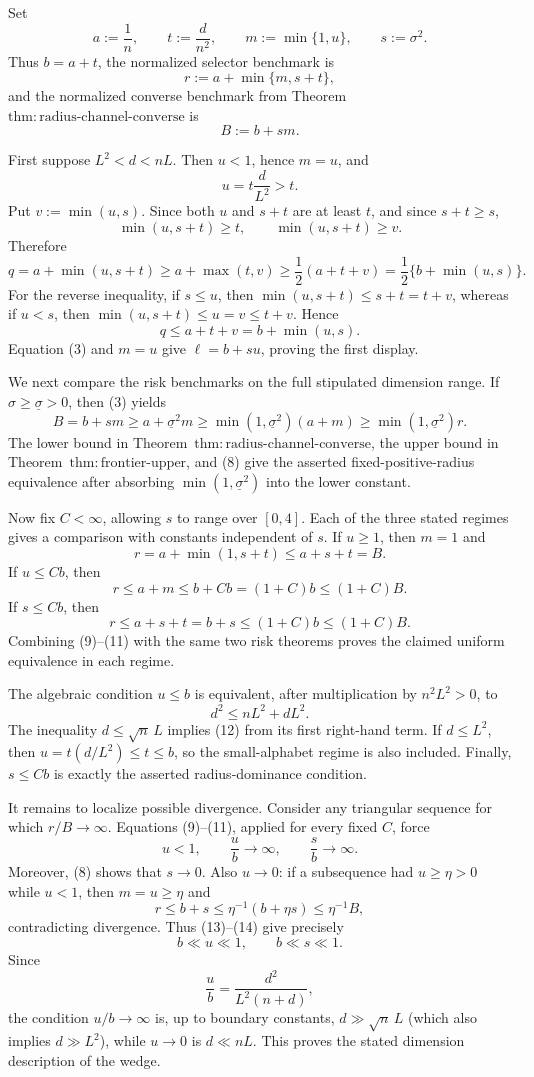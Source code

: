 Set
\[
 a:=\frac1n,\qquad t:=\frac d{n^2},\qquad
 m:=\min\{1,u\},\qquad s:=\sigma^2.
\tag{1}
\]
Thus \(b=a+t\), the normalized selector benchmark is
\[
 r:=a+\min\{m,s+t\},
\tag{2}
\]
and the normalized converse benchmark from Theorem~\(\mathrm{thm:radius\text{-}channel\text{-}converse}\) is
\[
 B:=b+sm.
\tag{3}
\]

First suppose \(L^2<d<nL\).  Then \(u<1\), hence \(m=u\), and
\[
 u=t\frac d{L^2}>t.
\tag{4}
\]
Put \(v:=\min(u,s)\).  Since both \(u\) and \(s+t\) are at least \(t\), and since \(s+t\ge s\),
\[
 \min(u,s+t)\ge t,
 \qquad
 \min(u,s+t)\ge v.
\tag{5}
\]
Therefore
\[
 q=a+\min(u,s+t)
 \ge a+\max(t,v)
 \ge \frac12(a+t+v)
 =\frac12\{b+\min(u,s)\}.
\tag{6}
\]
For the reverse inequality, if \(s\le u\), then \(\min(u,s+t)\le s+t=t+v\), whereas if \(u<s\), then \(\min(u,s+t)\le u=v\le t+v\).  Hence
\[
 q\le a+t+v=b+\min(u,s).
\tag{7}
\]
Equation (3) and \(m=u\) give \(\ell=b+su\), proving the first display.

We next compare the risk benchmarks on the full stipulated dimension range.  If \(\sigma\ge\underline\sigma>0\), then (3) yields
\[
 B=b+sm\ge a+\underline\sigma^2m
 \ge \min(1,\underline\sigma^2)(a+m)
 \ge \min(1,\underline\sigma^2)r.
\tag{8}
\]
The lower bound in Theorem~\(\mathrm{thm:radius\text{-}channel\text{-}converse}\), the upper bound in Theorem~\(\mathrm{thm:frontier\text{-}upper}\), and (8) give the asserted fixed-positive-radius equivalence after absorbing \(\min(1,\underline\sigma^2)\) into the lower constant.

Now fix \(C<\infty\), allowing \(s\) to range over \([0,4]\).  Each of the three stated regimes gives a comparison with constants independent of \(s\).  If \(u\ge1\), then \(m=1\) and
\[
 r=a+\min(1,s+t)\le a+s+t=B.
\tag{9}
\]
If \(u\le Cb\), then
\[
 r\le a+m\le b+Cb=(1+C)b\le(1+C)B.
\tag{10}
\]
If \(s\le Cb\), then
\[
 r\le a+s+t=b+s\le(1+C)b\le(1+C)B.
\tag{11}
\]
Combining (9)--(11) with the same two risk theorems proves the claimed uniform equivalence in each regime.

The algebraic condition \(u\le b\) is equivalent, after multiplication by \(n^2L^2>0\), to
\[
 d^2\le nL^2+dL^2.
\tag{12}
\]
The inequality \(d\le\sqrt n\,L\) implies (12) from its first right-hand term.  If \(d\le L^2\), then \(u=t(d/L^2)\le t\le b\), so the small-alphabet regime is also included.  Finally, \(s\le Cb\) is exactly the asserted radius-dominance condition.

It remains to localize possible divergence.  Consider any triangular sequence for which \(r/B\to\infty\).  Equations (9)--(11), applied for every fixed \(C\), force
\[
 u<1,\qquad \frac ub\longrightarrow\infty,\qquad
 \frac sb\longrightarrow\infty.
\tag{13}
\]
Moreover, (8) shows that \(s\to0\).  Also \(u\to0\): if a subsequence had \(u\ge\eta>0\) while \(u<1\), then \(m=u\ge\eta\) and
\[
 r\le b+s\le \eta^{-1}(b+\eta s)\le\eta^{-1}B,
\tag{14}
\]
contradicting divergence.  Thus (13)--(14) give precisely
\[
 b\ll u\ll1,\qquad b\ll s\ll1.
\tag{15}
\]
Since
\[
 \frac ub=\frac{d^2}{L^2(n+d)},
\tag{16}
\]
the condition \(u/b\to\infty\) is, up to boundary constants, \(d\gg\sqrt n\,L\) (which also implies \(d\gg L^2\)), while \(u\to0\) is \(d\ll nL\).  This proves the stated dimension description of the wedge.

